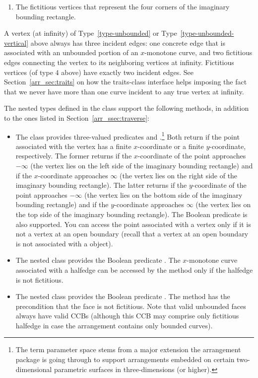 \begin{ccAdvanced}
\begin{enumerate}
\item\label{type-fictitious}
  The fictitious vertices that represent the four corners of the
  imaginary bounding rectangle.
\end{enumerate}
A vertex (at infinity) of Type~\ref{type-unbounded} or
Type~\ref{type-unbounded-vertical} above always has
three incident edges: one concrete edge that is associated with an
unbounded portion of an $x$-monotone curve, and two fictitious edges
connecting the vertex to its neighboring vertices at infinity.
Fictitious vertices (of type 4 above) have exactly two incident edges.
See Section~\ref{arr_sec:traits} on how the traits-class interface
helps imposing the fact that we never have more than one curve
incident to any true vertex at infinity.

The nested types defined in the  class support the
following methods, in addition to the ones listed in
Section~\ref{arr_ssec:traverse}:
\begin{itemize}
\item
 The  class provides three-valued predicates
   and
  .\footnote{The term parameter space
    stems from a major extension the arrangement package is going
    through to support arrangements embedded on certain
    two-dimensional parametric surfaces in three-dimensions (or
    higher).} Both return  if the point associated
  with the vertex has a finite $x$-coordinate or a finite
  $y$-coordinate, respectively. The former returns
   if the $x$-coordinate of the point
  approaches $-\infty$ (the vertex lies on the left side of the
  imaginary bounding rectangle) and  if the
  $x$-coordinate approaches $\infty$ (the vertex lies on the right
  side of the imaginary bounding rectangle). The latter returns
   if the $y$-coordinate of the point
  approaches $-\infty$ (the vertex lies on the bottom side of the
  imaginary bounding rectangle) and  if the
  $y$-coordinate approaches $\infty$ (the vertex lies on the top side
  of the imaginary bounding rectangle). The Boolean predicate
   is also supported. You can access the
  point associated with a vertex only if it is not a vertex at an open
  boundary (recall that a vertex at an open boundary is not associated
  with a  object).
%
\item
  The nested  class provides the Boolean predicate
  . The $x$-monotone curve associated with
  a halfedge can be accessed by the  method only if the
  halfedge is not fictitious.
%
\item
  The nested  class provides the Boolean predicate
  . The method  has the
  precondition that the face is not fictitious. Note that valid
  unbounded faces always have valid CCBs (although this CCB may
  comprise only fictitious halfedge in case the arrangement contains
  only bounded curves).
\end{itemize}


\end{ccAdvanced}
